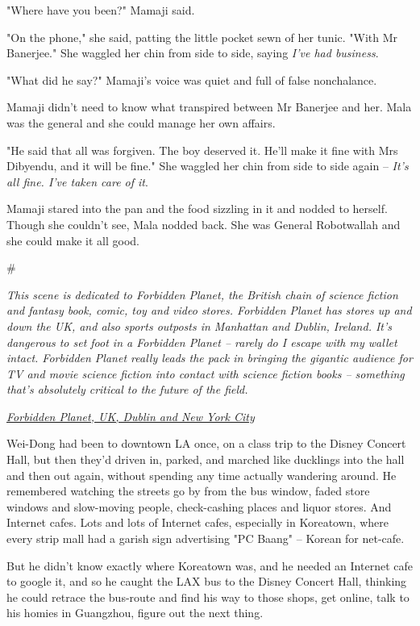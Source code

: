 "Where have you been?" Mamaji said.

"On the phone," she said, patting the little pocket sewn of her
tunic. "With Mr Banerjee." She waggled her chin from side to side,
saying \emph{I've had business}.

"What did he say?" Mamaji's voice was quiet and full of false
nonchalance.

Mamaji didn't need to know what transpired between Mr Banerjee and
her. Mala was the general and she could manage her own affairs.

"He said that all was forgiven. The boy deserved it. He'll make it
fine with Mrs Dibyendu, and it will be fine." She waggled her chin
from side to side again --
\emph{It's all fine. I've taken care of it}.

Mamaji stared into the pan and the food sizzling in it and nodded
to herself. Though she couldn't see, Mala nodded back. She was
General Robotwallah and she could make it all good.

\#

\emph{This scene is dedicated to Forbidden Planet, the British chain of science fiction and fantasy book, comic, toy and video stores. Forbidden Planet has stores up and down the UK, and also sports outposts in Manhattan and Dublin, Ireland. It's dangerous to set foot in a Forbidden Planet -- rarely do I escape with my wallet intact. Forbidden Planet really leads the pack in bringing the gigantic audience for TV and movie science fiction into contact with science fiction books -- something that's absolutely critical to the future of the field.}





\emph{\href{http://www.forbiddenplanet.co.uk}{Forbidden Planet, UK, Dublin and New York City}}

Wei-Dong had been to downtown LA once, on a class trip to the
Disney Concert Hall, but then they'd driven in, parked, and marched
like ducklings into the hall and then out again, without spending
any time actually wandering around. He remembered watching the
streets go by from the bus window, faded store windows and
slow-moving people, check-cashing places and liquor stores. And
Internet cafes. Lots and lots of Internet cafes, especially in
Koreatown, where every strip mall had a garish sign advertising "PC
Baang" -- Korean for net-cafe.

But he didn't know exactly where Koreatown was, and he needed an
Internet cafe to google it, and so he caught the LAX bus to the
Disney Concert Hall, thinking he could retrace the bus-route and
find his way to those shops, get online, talk to his homies in
Guangzhou, figure out the next thing.

